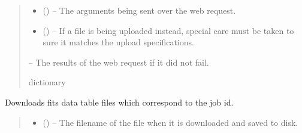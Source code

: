 \documentclass[letterpaper,11pt,english]{sphinxmanual}
\begin{document}
\begin{savenotes}
\begin{fulllineitems}
\begin{savenotes}
\begin{fulllineitems}
\begin{quote}
\begin{description}
\begin{itemize}
\item {} 
\sphinxAtStartPar
{} (\sphinxstyleliteralemphasis{\sphinxupquote{, }}) – The arguments being sent over the web request.

\item {} 
\sphinxAtStartPar
{} (\sphinxstyleliteralemphasis{\sphinxupquote{, }}) – If a file is being uploaded instead, special care must be taken to
sure it matches the upload specifications.

\end{itemize}

\sphinxAtStartPar
{} – The results of the web request if it did not fail.

\sphinxAtStartPar
dictionary

\end{description}\end{quote}

\end{fulllineitems}\end{savenotes}


\begin{savenotes}\begin{fulllineitems}
\label{\detokenize{code/opihiexarata.astrometry.webclient:opihiexarata.astrometry.webclient.AstrometryNetWebAPIEngine.download_result_file}}
\pysigstartsignatures
{}
\pysigstopsignatures
\sphinxAtStartPar
Downloads fits data table files which correspond to the job id.
\begin{quote}\begin{description}
\begin{itemize}
\item {} 
\sphinxAtStartPar
{} () – The filename of the file when it is downloaded and saved to disk.


\end{itemize}
\end{description}
\end{quote}
\end{fulllineitems}
\end{savenotes}
\end{fulllineitems}
\end{savenotes}
\end{document}
